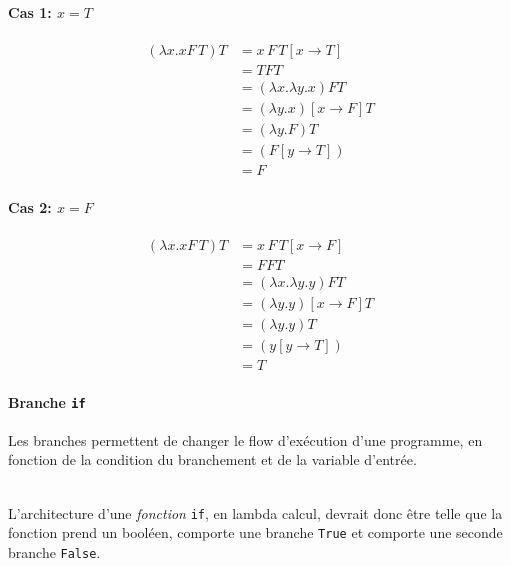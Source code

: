 \documentclass{report}
\begin{document}
\begin{multicols*}{3}
  \paragraph{Cas 1: \(x = T\)}
  \begin{align*}
    (\lambda x . x F \, T) T &= x \, F \, T[x \rightarrow T] \\
                                  &= T F T \\ 
                                  &= (\lambda x . \lambda y . x) F T \\ 
                                  &= (\lambda y . x )[x \rightarrow F] T \\
                                  &= (\lambda y . F) T \\ 
                                  &= (F [y \rightarrow T]) \\ 
                                  &= F
  \end{align*}


  \paragraph{Cas 2: \(x = F\)}
  \begin{align*}
    (\lambda x . x F \, T) T &= x \, F \, T[x \rightarrow F] \\
                                  &= F F T \\ 
                                  &= (\lambda x . \lambda y . y) F T \\ 
                                  &= (\lambda y . y )[x \rightarrow F] T \\
                                  &= (\lambda y . y) T \\ 
                                  &= (y [y \rightarrow T]) \\ 
                                  &= T
  \end{align*}

  \paragraph{Branche \texttt{if}}
  Les branches permettent de changer le flow d'exécution d'une programme, 
  en fonction de la condition du branchement et de la variable d'entrée. 

  \mbox{}\\ 
  \noindent 
  L'architecture d'une \textit{fonction} 
  \texttt{if}, en lambda calcul, devrait donc être telle que la fonction  
  prend un booléen, comporte une branche \texttt{True} et 
  comporte une seconde branche \texttt{False}.   



\end{multicols*}
\end{document}
